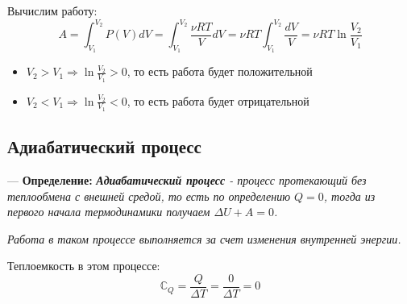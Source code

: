 \documentclass[12pt,a4paper]{report}
\begin{document}
\begin{center}
\end{center}
Вычислим работу:
\[ A = \int_{V_1}^{V_2}P(V)dV = \int_{V_1}^{V_2}\frac{\nu R T}{V}dV = \nu RT \int_{V_1}^{V_2} \frac{dV}{V}  = \nu RT \ln{\frac{V_2}{V_1}}\]
\begin{itemize}
    \item $V_2 > V_1 \Rightarrow \ln{\frac{V_2}{V_1}} > 0$, то есть работа будет положительной
    \item $V_2 < V_1 \Rightarrow \ln{\frac{V_2}{V_1}} < 0$, то есть работа будет отрицательной
\end{itemize}

\subsection{Адиабатический процесс}
--- \textbf{Определение:} \textit{\textbf{Адиабатический процесс} - процесс протекающий без теплообмена с внешней средой, то есть по определению $Q = 0$, тогда из первого начала термодинамики получаем $\Delta U + A = 0$. }

\textit{Работа в таком процессе выполняется за счет изменения внутренней энергии.}

\vspace{4px}

Теплоемкость в этом процессе: \[ \mathbb{C}_Q = \frac{Q}{\Delta T} = \frac{0}{\Delta T} = 0 \]
\end{document}
